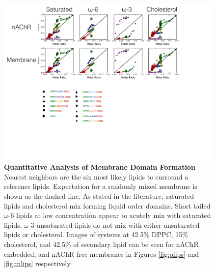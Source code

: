 \documentclass[10pt, letterpaper]{article}
\begin{document}
\begin{figure}[H]
   \centerline{\includegraphics[width=\textwidth,scale=0.5]{NN.pdf}}
   \caption[Quantitative Analysis of Membrane Domain Formation]{\textbf{Quantitative Analysis of Membrane Domain Formation} Nearest neighbors are the six most likely lipids to surround a reference lipids. Expectation for a randomly mixed membrane is shown as the dashed line. As stated in the literature, saturated lipids and cholesterol mix forming liquid order domains. Short tailed $\omega$-6 lipids at low concentration appear to acutely mix with saturated lipids. $\omega$-3 unsaturated lipids do not mix with either unsaturated lipids or cholesterol. Images of systems at 42.5\% DPPC, 15\% cholesterol, and 42.5\% of secondary lipid can be seen for nAChR embedded, and nAChR free membranes in Figures \ref{fig:plips} and \ref{fig:mlips} respectively}\label{fig:nn}

\end{figure}
   \newpage
\end{document}
